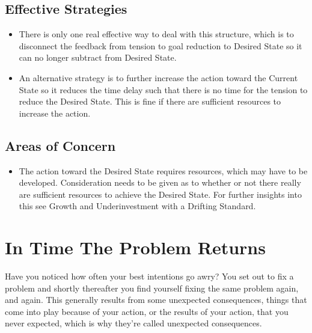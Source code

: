 \documentclass[]{memoir}
\begin{document}
\subsection{Effective Strategies}

\begin{itemize}
\itemsep1pt\parskip0pt
\item
  There is only one real effective way to deal with this structure,
  which is to disconnect the feedback from tension to goal reduction to
  Desired State so it can no longer subtract from Desired State.
\item
  An alternative strategy is to further increase the action toward the
  Current State so it reduces the time delay such that there is no time
  for the tension to reduce the Desired State. This is fine if there are
  sufficient resources to increase the action.
\end{itemize}

\subsection{Areas of Concern}

\begin{itemize}
\itemsep1pt\parskip0pt
\item
  The action toward the Desired State requires resources, which may have
  to be developed. Consideration needs to be given as to whether or not
  there really are sufficient resources to achieve the Desired State.
  For further insights into this see Growth and Underinvestment with a
  Drifting Standard.
\end{itemize}

\section{In Time The Problem Returns}

Have you noticed how often your best intentions go awry? You set out to
fix a problem and shortly thereafter you find yourself fixing the same
problem again, and again. This generally results from some unexpected
consequences, things that come into play because of your action, or the
results of your action, that you never expected, which is why they're
called unexpected consequences.

\FloatBarrier 
\end{document}
